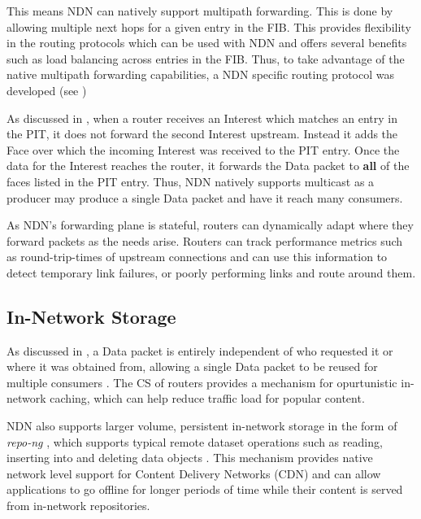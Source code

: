 This means NDN can natively support multipath forwarding. This is done by allowing multiple next hops for a given entry in the FIB. This provides flexibility in the routing protocols which can be used with NDN and offers several benefits such as load balancing across entries in the FIB. Thus, to take advantage of the native multipath forwarding capabilities, a NDN specific routing protocol was developed (see )

As discussed in , when a router receives an Interest which matches an entry in the PIT, it does not forward the second Interest upstream. Instead it adds the Face over which the incoming Interest was received to the PIT entry. Once the data for the Interest reaches the router, it forwards the Data packet to \textbf{all} of the faces listed in the PIT entry. Thus, NDN natively supports multicast as a producer may produce a single Data packet and have it reach many consumers. 

As NDN's forwarding plane is stateful, routers can dynamically adapt where they forward packets as the needs arise. Routers can track performance metrics such as round-trip-times of upstream connections and can use this information to detect temporary link failures, or poorly performing links and route around them.

\subsection{In-Network Storage}
As discussed in , a Data packet is entirely independent of who requested it or where it was obtained from, allowing a single Data packet to be reused for multiple consumers \cite{ndn}. The CS of routers provides a mechanism for opurtunistic in-network caching, which can help reduce traffic load for popular content. 

NDN also supports larger volume, persistent in-network storage in the form of \textit{repo-ng} \cite{ndn-repo}, which supports typical remote dataset operations such as reading, inserting into and deleting data objects \cite{ndn-repo-homepage}. This mechanism provides native network level support for Content Delivery Networks (CDN) \cite{ndn} and can allow applications to go offline for longer periods of 
time while their content is served from in-network repositories.




